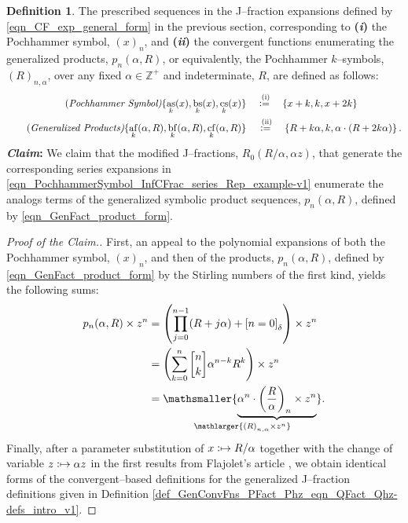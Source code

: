 \documentclass[12pt,reqno]{article}
\numberwithin{sfootnote}{section}
\numberwithin{equation}{section}
\theoremstyle{plain}
\theoremstyle{definition}
\newtheorem{definition}[theorem]{Definition}
\theoremstyle{remark}
\newcommand{\defequals}{\ensuremath{\vcentcolon=}}
\newcommand{\defmapsto}{\ensuremath{\vcentcolon\mapsto}}
\newcommand{\undersetbrace}[2]{\ensuremath{\underset{\mathlarger{#1}}{\mathsmaller{\underbrace{#2}}}}}
\newcommand{\gkpSI}[2]{\ensuremath{\genfrac{\lbrack}{\rbrack}{0pt}{}{#1}{#2}}}
\newcommand{\Pochhammer}[2]{\ensuremath{\left(#1\right)_{#2}}}
\newcommand{\Iverson}[1]{\ensuremath{\left[#1\right]_{\delta}}}
\newcommand{\pn}[3]{\ensuremath{p_{#1}\left(#2, #3\right)}}
\DeclareMathOperator{\as}{as}
\DeclareMathOperator{\bs}{bs}
\DeclareMathOperator{\cs}{cs}
\DeclareMathOperator{\af}{af}
\DeclareMathOperator{\bfcf}{bf}
\DeclareMathOperator{\cfcf}{cf}
\begin{document}
\begin{definition} 
The prescribed sequences in the J--fraction expansions defined by 
\eqref{eqn_CF_exp_general_form} in the previous section, corresponding to 
\textbf{(\emph{i})} the 
Pochhammer symbol, $\Pochhammer{x}{n}$, and 
\textbf{(\emph{ii})} the 
convergent functions enumerating the generalized products, 
$\pn{n}{\alpha}{R}$, or equivalently, the 
Pochhammer $k$--symbols, $\Pochhammer{R}{n,\alpha}$, 
over any fixed $\alpha \in \mathbb{Z}^{+}$ and 
indeterminate, $R$, are defined as follows: 
\begin{align*} 
\tag{\em Pochhammer Symbol} 
\{\as_k(x), \bs_k(x), \cs_k(x)\} & 
     \quad\overset{\text{ (i)}}{\defequals}\quad 
     \left\{ x+k, k, x+2k \right\} \\ 
\tag{\em Generalized Products} 
\{\af_k(\alpha, R), \bfcf_k(\alpha, R), \cfcf_k(\alpha, R)\} & 
     \quad\overset{\text{ (ii)}}{\defequals}\quad 
     \left\{ 
     R+k\alpha, k, \alpha \cdot (R+2k \alpha) 
     \right\}.  
\end{align*} 
\textbf{\textit{Claim}:} 
We claim that the modified J--fractions, $R_0(R / \alpha, \alpha z)$, 
that generate the corresponding series expansions in 
\eqref{eqn_PochhammerSymbol_InfCFrac_series_Rep_example-v1} 
enumerate the analogs terms of the generalized 
symbolic product sequences, $\pn{n}{\alpha}{R}$, 
defined by \eqref{eqn_GenFact_product_form}. 
\end{definition} 
\begin{proof}[Proof of the Claim.] 
First, an appeal to the polynomial expansions of both the 
Pochhammer symbol, $\Pochhammer{x}{n}$, and 
then of the products, $\pn{n}{\alpha}{R}$, 
defined by \eqref{eqn_GenFact_product_form} by the 
Stirling numbers of the first kind, yields the following sums: 
\begin{align} 
\notag 
p_n(\alpha, R) \times z^n & = 
     \left( 
     \prod_{j=0}^{n-1} (R+j\alpha) + \Iverson{n = 0} 
     \right) \times z^n \\ 
\notag 
   & = 
     \left( 
     \sum_{k=0}^{n} \gkpSI{n}{k} \alpha^{n-k} R^{k} 
     \right) \times z^{n} \\ 
\label{eqn_gen_pnAlphaR_seq_PochhammerSymbol_exps} 
   & = 
     \undersetbrace{\Pochhammer{R}{n,\alpha} \times z^{n}}{ 
     \alpha^{n} \cdot \Pochhammer{\frac{R}{\alpha}}{n} 
     \times z^{n}
     }. 
\end{align} 
Finally, after a parameter substitution of 
$x \defmapsto R / \alpha$ together with the change of variable 
$z \defmapsto \alpha z$ in the first results from 
Flajolet's article \citep{FLAJOLET80B}, 
we obtain identical forms of the convergent--based definitions for the 
generalized J--fraction definitions given in 
Definition \ref{def_GenConvFns_PFact_Phz_eqn_QFact_Qhz-defs_intro_v1}. 
\end{proof} 
\end{document}
